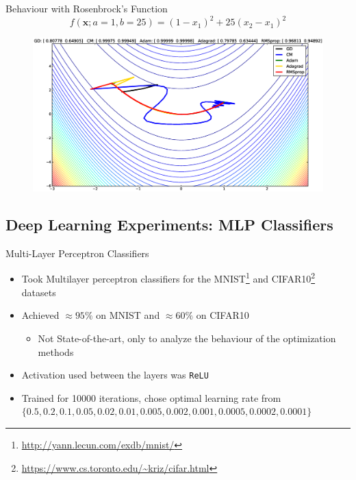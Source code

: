 \documentclass[10pt]{beamer}
\newcommand{\xbold}{\mathbf{x}}
\begin{document}
\begin{frame}{Behaviour with Rosenbrock's Function}
\begin{equation}
\label{RB}
f(\xbold;a=1, b=25) = (1 - x_{1})^{2} + 25(x_{2} - x_{1})^{2}
\end{equation}
\begin{figure}
\centering
\includegraphics[width=\linewidth]{./images/RB.eps}
\end{figure}
\end{frame}

\subsection{Deep Learning Experiments: MLP Classifiers}
\begin{frame}{Multi-Layer Perceptron Classifiers}
\begin{itemize}
\item<1->{Took Multilayer perceptron classifiers for the MNIST\footnote{\url{http://yann.lecun.com/exdb/mnist/}} and CIFAR10\footnote{\url{https://www.cs.toronto.edu/~kriz/cifar.html}} datasets}
\item<2->{Achieved \(\approx 95\%\) on MNIST and \(\approx 60\%\) on CIFAR10
          \begin{itemize}
          \item<3->{Not State-of-the-art, only to analyze the behaviour of the optimization methods}
          \end{itemize}
         }
\item<3->{Activation used between the layers was \texttt{ReLU}}
\item<4->{Trained for 10000 iterations, chose optimal learning rate from \(\{0.5, 0.2, 0.1, 0.05, 0.02, 0.01, 0.005, 0.002, 0.001, 0.0005, 0.0002, 0.0001\}\)}
\end{itemize}
\end{frame}
\end{document}
